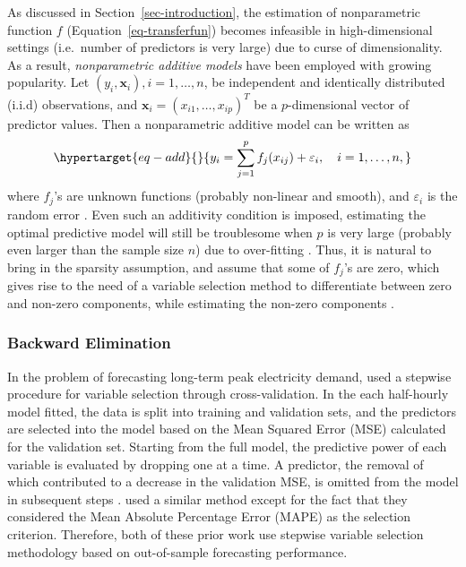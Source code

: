 \documentclass[11pt,a4paper,]{article}
\begin{document}
As discussed in Section~\ref{sec-introduction}, the estimation of
nonparametric function \(f\) (Equation~\ref{eq-transferfun}) becomes
infeasible in high-dimensional settings (i.e.~number of predictors is
very large) due to curse of dimensionality. As a result,
\emph{nonparametric additive models} have been employed with growing
popularity. Let \((y_{i}, \bm{x}_{i}), i = 1, \dots, n\), be independent
and identically distributed (i.i.d) observations, and
\(\bm{x}_{i} = (x_{i1}, \dots, x_{ip})^{T}\) be a \(p\)-dimensional
vector of predictor values. Then a nonparametric additive model can be
written as \begin{equation}\protect\hypertarget{eq-add}{}{
 y_{i} = \sum_{j=1}^{p} {f_{j}(x_{ij})} + \varepsilon_{i}, \quad i = 1, \dots, n,
}\label{eq-add}\end{equation} where \(f_{j}\)'s are unknown functions
(probably non-linear and smooth), and \(\varepsilon_{i}\) is the random
error \autocite{Lian2012}. Even such an additivity condition is imposed,
estimating the optimal predictive model will still be troublesome when
\(p\) is very large (probably even larger than the sample size \(n\))
due to over-fitting \autocite{Lian2012}. Thus, it is natural to bring in
the sparsity assumption, and assume that some of \(f_{j}\)'s are zero,
which gives rise to the need of a variable selection method to
differentiate between zero and non-zero components, while estimating the
non-zero components \autocite{Huang2010}.

\hypertarget{backward-elimination}{%
\subsubsection{Backward Elimination}\label{backward-elimination}}

In the problem of forecasting long-term peak electricity demand,
\textcite{HF2010} used a stepwise procedure for variable selection
through cross-validation. In the each half-hourly model fitted, the data
is split into training and validation sets, and the predictors are
selected into the model based on the Mean Squared Error (MSE) calculated
for the validation set. Starting from the full model, the predictive
power of each variable is evaluated by dropping one at a time. A
predictor, the removal of which contributed to a decrease in the
validation MSE, is omitted from the model in subsequent steps
\autocite{HF2010}. \textcite{FH2012} used a similar method except for
the fact that they considered the Mean Absolute Percentage Error (MAPE)
as the selection criterion. Therefore, both of these prior work use
stepwise variable selection methodology based on out-of-sample
forecasting performance.
\end{document}
